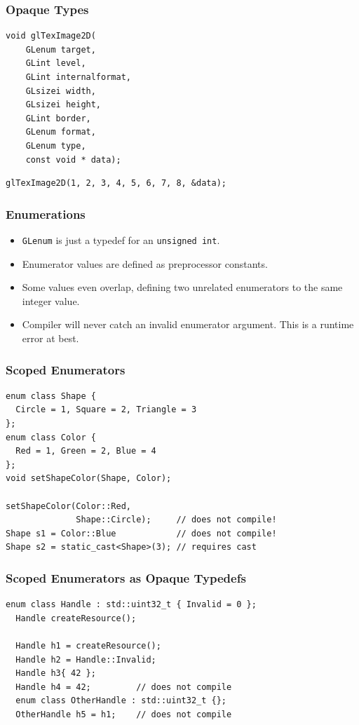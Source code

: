 \documentclass[aspectratio=169]{beamer}
\newif\iftransitions
\newcommand{\cpause}{\iftransitions \pause \fi}
\begin{document}
\begin{frame}[fragile]
  \frametitle{Opaque Types}
  
  \begin{lstlisting}[style=cpp20]
  void glTexImage2D(
    GLenum target,
    GLint level,
    GLint internalformat,
    GLsizei width,
    GLsizei height,
    GLint border,
    GLenum format,
    GLenum type,
    const void * data);
  \end{lstlisting}
  
  \cpause
  \begin{lstlisting}[style=cpp20]
  glTexImage2D(1, 2, 3, 4, 5, 6, 7, 8, &data);
  \end{lstlisting}
\end{frame}

\begin{frame}

  \frametitle{Enumerations}

  \begin{itemize}
    \item \texttt{GLenum} is just a typedef for an \texttt{unsigned int}.
    \item Enumerator values are defined as preprocessor constants.
    \item Some values even overlap, defining two unrelated enumerators to the same integer value.
    \item Compiler will never catch an invalid enumerator argument. This is a runtime error at best.
  \end{itemize}

\end{frame}

\begin{frame}[fragile]
  \frametitle{Scoped Enumerators}
  
  \begin{lstlisting}[style=cpp20]
enum class Shape {
  Circle = 1, Square = 2, Triangle = 3
};
enum class Color {
  Red = 1, Green = 2, Blue = 4
};
void setShapeColor(Shape, Color);

setShapeColor(Color::Red,
              Shape::Circle);     // does not compile!
Shape s1 = Color::Blue            // does not compile!
Shape s2 = static_cast<Shape>(3); // requires cast
  \end{lstlisting}
\end{frame}

\begin{frame}[fragile]

  \frametitle{Scoped Enumerators as Opaque Typedefs}

  \begin{lstlisting}[style=cpp20]
  enum class Handle : std::uint32_t { Invalid = 0 };
  Handle createResource();
  
  Handle h1 = createResource();
  Handle h2 = Handle::Invalid;
  Handle h3{ 42 };
  Handle h4 = 42;         // does not compile
  enum class OtherHandle : std::uint32_t {};
  OtherHandle h5 = h1;    // does not compile
  \end{lstlisting}
\end{frame}
\end{document}
